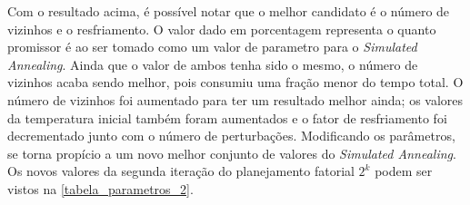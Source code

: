 \documentclass[
	12pt,				%
	twoside,			%
	a4paper,			%
	english,			%
	french,				%
	spanish,			%
	brazil				%
	]{abntex2}
\begin{document}
Com o resultado acima, é possível notar que o melhor candidato é o
número de vizinhos e o resfriamento. O valor dado em porcentagem
representa o quanto promissor é ao ser tomado como um valor de parametro
para o \emph{Simulated Annealing}. Ainda que o valor de ambos tenha sido
o mesmo, o número de vizinhos acaba sendo melhor, pois consumiu uma
fração menor do tempo total. O número de vizinhos foi aumentado para ter
um resultado melhor ainda; os valores da temperatura inicial também
foram aumentados e o fator de resfriamento foi decrementado junto com o
número de perturbações. Modificando os parâmetros, se torna propício a
um novo melhor conjunto de valores do \emph{Simulated Annealing}. Os
novos valores da segunda iteração do planejamento fatorial \(2^{k}\)
podem ser vistos na \autoref{tabela_parametros_2}.

\begin{table}[ht]
    \centering
    \caption{Fatores para parâmetro para o \textit{Simulated Annealing} na segunda iteração}
    \label{tabela_parametros_2}
\end{table}
\end{document}
